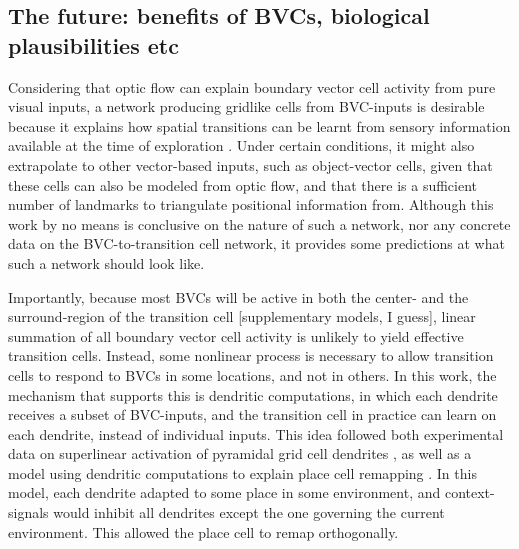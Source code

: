 \documentclass{article}
\begin{document}
    \subsection{The future: benefits of BVCs, biological plausibilities etc} \label{Future: BVCs}

    Considering that optic flow can explain boundary vector cell activity from pure visual inputs, a network producing gridlike cells from BVC-inputs is desirable because it explains how spatial transitions can be learnt from sensory information available at the time of exploration \parencite{Raudies2012}. Under certain conditions, it might also extrapolate to other vector-based inputs, such as object-vector cells, given that these cells can also be modeled from optic flow, and that there is a sufficient number of landmarks to triangulate positional information from. Although this work by no means is conclusive on the nature of such a network, nor any concrete data on the BVC-to-transition cell network, it provides some predictions at what such a network should look like.

    Importantly, because most BVCs will be active in both the center- and the surround-region of the transition cell [supplementary models, I guess], linear summation of all boundary vector cell activity is unlikely to yield effective transition cells. Instead, some nonlinear process is necessary to allow transition cells to respond to BVCs in some locations, and not in others. In this work, the mechanism that supports this is dendritic computations, in which each dendrite receives a subset of BVC-inputs, and the transition cell in practice can learn on each dendrite, instead of individual inputs. This idea followed both experimental data on superlinear activation of pyramidal grid cell dendrites \parencite{Schmidt-Hieber2017}, as well as a model using dendritic computations to explain place cell remapping \parencite{Alabi2022}. In this model, each dendrite adapted to some place in some environment, and context-signals would inhibit all dendrites except the one governing the current environment. This allowed the place cell to remap orthogonally.
\end{document}

